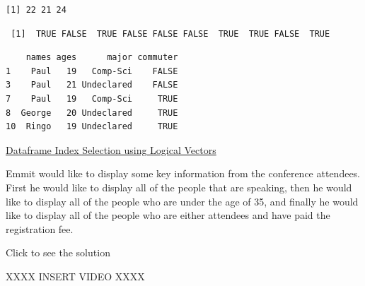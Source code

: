 \documentclass[
  letterpaper,
  DIV=11,
  numbers=noendperiod]{scrreprt}
\newenvironment{Shaded}{\begin{snugshade}}{\end{snugshade}}
\newcommand{\CommentTok}[1]{\textcolor[rgb]{0.37,0.37,0.37}{#1}}
\newcommand{\DecValTok}[1]{\textcolor[rgb]{0.68,0.00,0.00}{#1}}
\newcommand{\NormalTok}[1]{\textcolor[rgb]{0.00,0.23,0.31}{#1}}
\newcommand{\SpecialCharTok}[1]{\textcolor[rgb]{0.37,0.37,0.37}{#1}}
\begin{document}
\begin{verbatim}
[1] 22 21 24
\end{verbatim}

\begin{Shaded}
\end{Shaded}

\begin{verbatim}
 [1]  TRUE FALSE  TRUE FALSE FALSE FALSE  TRUE  TRUE FALSE  TRUE
\end{verbatim}

\begin{Shaded}
\end{Shaded}

\begin{verbatim}
    names ages      major commuter
1    Paul   19   Comp-Sci    FALSE
3    Paul   21 Undeclared    FALSE
7    Paul   19   Comp-Sci     TRUE
8  George   20 Undeclared     TRUE
10  Ringo   19 Undeclared     TRUE
\end{verbatim}

\begin{watch}{}{}
    \href{https://youtu.be/hksRGX-YT6w}{Dataframe Index Selection using Logical Vectors}
\end{watch}

\begin{tcolorbox}[enhanced jigsaw, colframe=quarto-callout-tip-color-frame, colback=white, breakable, rightrule=.15mm, title=\textcolor{quarto-callout-tip-color}{\faLightbulb}\hspace{0.5em}{Try it Out}, bottomtitle=1mm, toptitle=1mm, titlerule=0mm, left=2mm, coltitle=black, colbacktitle=quarto-callout-tip-color!10!white, leftrule=.75mm, opacitybacktitle=0.6, bottomrule=.15mm, opacityback=0, arc=.35mm, toprule=.15mm]

Emmit would like to display some key information from the conference
attendees. First he would like to display all of the people that are
speaking, then he would like to display all of the people who are under
the age of 35, and finally he would like to display all of the people
who are either attendees and have paid the registration fee.

Click to see the solution

XXXX INSERT VIDEO XXXX

\end{tcolorbox}
\end{document}
